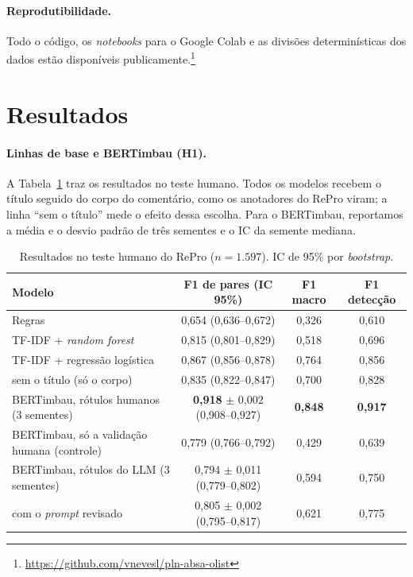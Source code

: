 \documentclass[a4paper, twocolumn, 11pt, twoside]{article}
\begin{document}
\paragraph{Reprodutibilidade.} Todo o código, os \emph{notebooks} para o Google Colab e as divisões determinísticas dos dados estão disponíveis publicamente.\footnote{\url{https://github.com/vnevesl/pln-absa-olist}}

\section{Resultados}

\paragraph{Linhas de base e BERTimbau (H1).} A Tabela~\ref{tab:resultados} traz os resultados no teste humano. Todos os modelos recebem o título seguido do corpo do comentário, como os anotadores do RePro viram; a linha ``sem o título'' mede o efeito dessa escolha. Para o BERTimbau, reportamos a média e o desvio padrão de três sementes e o IC da semente mediana.

\begin{table}[htb]
\centering
\small
\begin{tabular}{lccc}
\toprule
Modelo & F1 de pares (IC 95\%) & F1 macro & F1 detecção \\
\midrule
Regras                         & 0,654 (0,636--0,672) & 0,326 & 0,610 \\
TF-IDF + \emph{random forest}  & 0,815 (0,801--0,829) & 0,518 & 0,696 \\
TF-IDF + regressão logística   & 0,867 (0,856--0,878) & 0,764 & 0,856 \\
\quad sem o título (só o corpo) & 0,835 (0,822--0,847) & 0,700 & 0,828 \\
\midrule
BERTimbau, rótulos humanos (3 sementes) & \textbf{0,918} $\pm$ 0,002 (0,908--0,927) & \textbf{0,848} & \textbf{0,917} \\
BERTimbau, só a validação humana (controle) & 0,779 (0,766--0,792) & 0,429 & 0,639 \\
BERTimbau, rótulos do LLM (3 sementes)  & 0,794 $\pm$ 0,011 (0,779--0,802) & 0,594 & 0,750 \\
\quad com o \emph{prompt} revisado        & 0,805 $\pm$ 0,002 (0,795--0,817) & 0,621 & 0,775 \\
\bottomrule
\end{tabular}
\caption{Resultados no teste humano do RePro ($n = 1.597$). IC de 95\% por \emph{bootstrap}.}
\label{tab:resultados}
\end{table}
\end{document}
